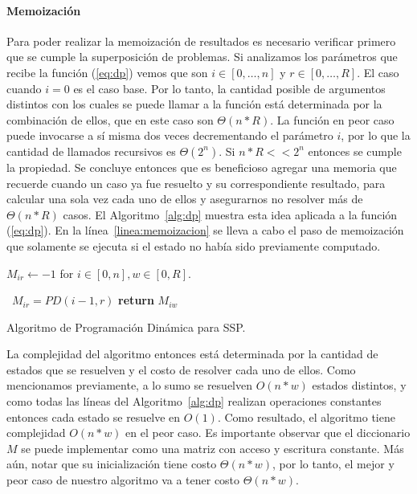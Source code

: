 \documentclass[10pt,a4paper]{article}
\begin{document}
\paragraph{Memoización}
Para poder realizar la memoización de resultados es necesario verificar primero que se cumple la superposición de problemas. Si analizamos los parámetros que recibe la función (\ref{eq:dp}) vemos que son $i \in [0, \hdots, n]$ y $r \in [0, \hdots, R]$. El caso cuando $i = 0$ es el caso base. Por lo tanto, la cantidad posible de argumentos distintos con los cuales se puede llamar a la función está determinada por la combinación de ellos, que en este caso son $\Theta(n * R)$. La función en peor caso puede invocarse a sí misma dos veces decrementando el parámetro $i$, por lo que la cantidad de llamados recursivos es $\Theta(2^n)$. Si $n*R << 2^n$ entonces se cumple la propiedad. 
Se concluye entonces que es beneficioso agregar una memoria que recuerde cuando un caso ya fue resuelto y su correspondiente resultado, para calcular una sola vez cada uno de ellos y asegurarnos no resolver más de $\Theta(n * R)$ casos. El Algoritmo~\ref{alg:dp} muestra esta idea aplicada a la función (\ref{eq:dp}). En la línea~\ref{linea:memoizacion} se lleva a cabo el paso de memoización que solamente se ejecuta si el estado no había sido previamente computado.

\begin{algorithm}
\begin{algorithmic}[1]
\State $M_{ir} \gets -1$ for $i \in [0, n], w \in [0, R]$.
    	
    	\
    		$M_{ir} = PD(i-1,r)$
    	\EndIf
    \EndIf
    \label{linea:memoizacion}
    \State \textbf{return} $M_{iw}$
\EndFunction
\end{algorithmic}
\caption{Algoritmo de Programación Dinámica para SSP.}
\label{alg:dp}
\end{algorithm}

La complejidad del algoritmo entonces está determinada por la cantidad de estados que se resuelven y el costo de resolver cada uno de ellos. Como mencionamos previamente, a lo sumo se resuelven $O(n * w)$ estados distintos, y como todas las líneas del Algoritmo~\ref{alg:dp} realizan operaciones constantes entonces cada estado se resuelve en $O(1)$. Como resultado, el algoritmo tiene complejidad $O(n*w)$ en el peor caso. Es importante observar que el diccionario $M$ se puede implementar como una matriz con acceso y escritura constante. Más aún, notar que su inicialización tiene costo $\Theta(n*w)$, por lo tanto, el mejor y peor caso de nuestro algoritmo va a tener costo $\Theta(n*w)$.
\end{document}
